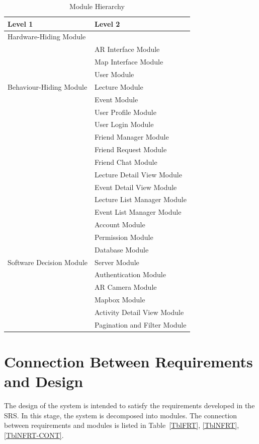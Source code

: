 \documentclass[12pt, titlepage]{article}
\begin{document}
\begin{table}[H]
\centering
\begin{tabular}{p{} p{}}
\toprule
\textbf{Level 1} & \textbf{Level 2}\\
\midrule

{Hardware-Hiding Module} & ~ \\
\midrule

\multirow{7}{0.3\textwidth}{Behaviour-Hiding Module}
& AR Interface Module\\
& Map Interface Module\\
& User Module\\
& Lecture Module\\
& Event Module\\
& User Profile Module\\
& User Login Module\\
& Friend Manager Module\\ 
& Friend Request Module\\
& Friend Chat Module\\
& Lecture Detail View Module\\
& Event Detail View Module\\
& Lecture List Manager Module\\
& Event List Manager Module\\
& Account Module\\
& Permission Module\\
\midrule

\multirow{3}{0.3\textwidth}{Software Decision Module}
& Database Module\\
& Server Module\\
& Authentication Module\\
& AR Camera Module\\
& Mapbox Module\\
& Activity Detail View Module\\
& Pagination and Filter Module\\
\bottomrule

\end{tabular}
\caption{Module Hierarchy}
\label{TblMH}
\end{table}

\section{Connection Between Requirements and Design} \label{SecConnection}

The design of the system is intended to satisfy the requirements developed in
the SRS. In this stage, the system is decomposed into modules. The connection
between requirements and modules is listed in Table~\ref{TblFRT}, \ref{TblNFRT}, \ref{TblNFRT-CONT}.
\end{document}
